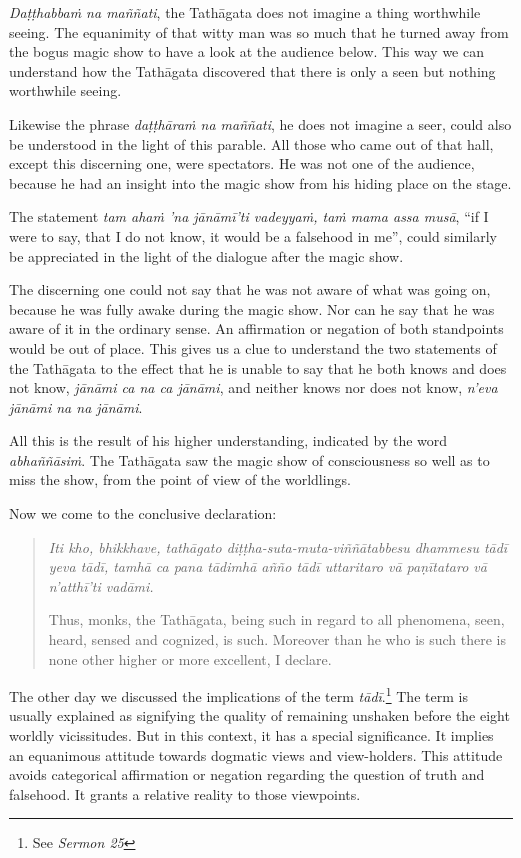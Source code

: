 \emph{Daṭṭhabbaṁ na maññati}, the Tathāgata does not imagine a thing worthwhile seeing. The equanimity of that witty man was so much that he turned away from the bogus magic show to have a look at the audience below. This way we can understand how the Tathāgata discovered that there is only a seen but nothing worthwhile seeing.

Likewise the phrase \emph{daṭṭhāraṁ na maññati}, he does not imagine a seer, could also be understood in the light of this parable. All those who came out of that hall, except this discerning one, were spectators. He was not one of the audience, because he had an insight into the magic show from his hiding place on the stage.

The statement \emph{tam ahaṁ 'na jānāmī'ti vadeyyaṁ, taṁ mama assa musā}, ``if I were to say, that I do not know, it would be a falsehood in me'', could similarly be appreciated in the light of the dialogue after the magic show.

The discerning one could not say that he was not aware of what was going on, because he was fully awake during the magic show. Nor can he say that he was aware of it in the ordinary sense. An affirmation or negation of both standpoints would be out of place. This gives us a clue to understand the two statements of the Tathāgata to the effect that he is unable to say that he both knows and does not know, \emph{jānāmi ca na ca jānāmi}, and neither knows nor does not know, \emph{n'eva jānāmi na na jānāmi}.

All this is the result of his higher understanding, indicated by the word \emph{abhaññāsiṁ}. The Tathāgata saw the magic show of consciousness so well as to miss the show, from the point of view of the worldlings.

Now we come to the conclusive declaration:

\begin{quote}
\emph{Iti kho, bhikkhave, tathāgato diṭṭha-suta-muta-viññātabbesu dhammesu tādī yeva tādī, tamhā ca pana tādimhā añño tādī uttaritaro vā paṇītataro vā n'atthī'ti vadāmi.}

Thus, monks, the Tathāgata, being such in regard to all phenomena, seen, heard, sensed and cognized, is such. Moreover than he who is such there is none other higher or more excellent, I declare.
\end{quote}

The other day we discussed the implications of the term \emph{tādī}.\footnote{See \emph{Sermon 25}} The term is usually explained as signifying the quality of remaining unshaken before the eight worldly vicissitudes. But in this context, it has a special significance. It implies an equanimous attitude towards dogmatic views and view-holders. This attitude avoids categorical affirmation or negation regarding the question of truth and falsehood. It grants a relative reality to those viewpoints.

